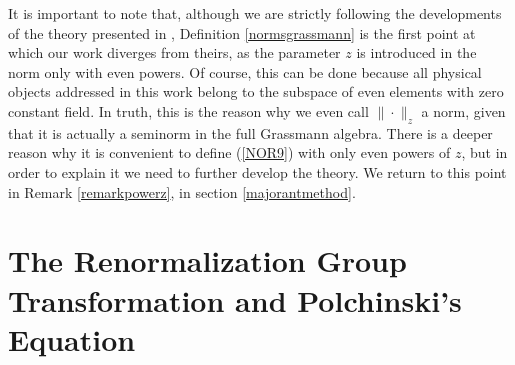 \documentclass[12pt,twoside]{amsart}
\numberwithin{equation}{section}
\begin{document}

It is important to note that, although we are strictly following the developments of the theory presented in \cite{BryWri,SW}, Definition \ref{normsgrassmann} is the first point at which our work diverges from theirs, as the parameter $z$ is introduced in the norm only with even powers. Of course, this can be done because all physical objects addressed in this work belong to the subspace of even elements with zero constant field. In truth, this is the reason why we even call $\|\cdot\|_{z}$ a norm, given that it is actually a seminorm in the full Grassmann algebra. There is a deeper reason why it is convenient to define (\ref{NOR9}) with only even powers of $z$, but in order to explain it we need to further develop the theory. We return to this point in Remark \ref{remarkpowerz}, in section \ref{majorantmethod}. 

\section{The Renormalization Group Transformation and Polchinski's Equation}\label{rgtransformation}
\end{document}
